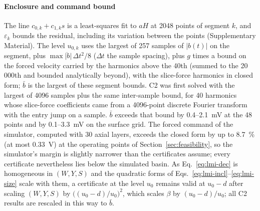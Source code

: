 \paragraph{Enclosure and command bound}
The line $c_{0,k}+c_{1,k}s$ is a least-squares fit to $aH$ at 2048 points of segment $k$, and $\varepsilon_k$ bounds the residual, including its variation between the points (Supplementary Material). The level $u_{0,k}$ uses the largest of 257 samples of $\lvert b(t)\rvert$ on the segment, plus $\max\lvert\ddot b\rvert\,\Delta t^2/8$ ($\Delta t$ the sample spacing), plus $g$ times a bound on the forced velocity carried by the harmonics above the 40th (summed to the 20\,000th and bounded analytically beyond), with the slice-force harmonics in closed form; $\bar b$ is the largest of these segment bounds. C2 was first solved with the largest of 4096 samples plus the same inter-sample bound, for 40 harmonics whose slice-force coefficients came from a 4096-point discrete Fourier transform with the entry jump on a sample. $\bar b$ exceeds that bound by 0.4--\SI{2.1}{\milli\volt} at the 48 points and by 0.1--\SI{3.3}{\milli\volt} on the surface grid. The forced command of the simulator, computed with 30 axial layers, exceeds the closed form by up to \SI{8.7}{\percent} (at most \SI{0.33}{\volt}) at the operating points of Section~\ref{sec:feasibility}, so the simulator's margin is slightly narrower than the certificates assume; every certificate nevertheless lies below the simulated basin. As Eq.~\eqref{eq:lmi-dec} is homogeneous in $(W,Y,S)$ and the quadratic forms of Eqs.~\eqref{eq:lmi-incl}--\eqref{eq:lmi-size} scale with them, a certificate at the level $u_0$ remains valid at $u_0-d$ after scaling $(W,Y,S)$ by $\big((u_0-d)/u_0\big)^2$, which scales $\beta$ by $(u_0-d)/u_0$; all C2 results are rescaled in this way to $\bar b$.

